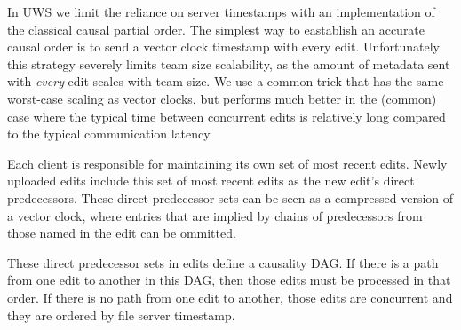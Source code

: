 \documentclass{article}
\begin{document}
In UWS we limit the reliance on server timestamps with an implementation of the classical causal partial order.
The simplest way to eastablish an accurate causal order is to send a vector clock timestamp with every edit.
Unfortunately this strategy severely limits team size scalability, as the amount of metadata sent with \emph{every} edit scales with team size.
We use a common trick that has the same worst-case scaling as vector clocks, but performs much better in the (common) case where the typical time between concurrent edits is relatively long compared to the typical communication latency.

Each client is responsible for maintaining its own set of most recent edits.
Newly uploaded edits include this set of most recent edits as the new edit's direct predecessors.
These direct predecessor sets can be seen as a compressed version of a vector clock, where entries that are implied by chains of predecessors from those named in the edit can be ommitted.

These direct predecessor sets in edits define a causality DAG.
If there is a path from one edit to another in this DAG, then those edits must be processed in that order.
If there is no path from one edit to another, those edits are concurrent and they are ordered by file server timestamp.
\end{document}
